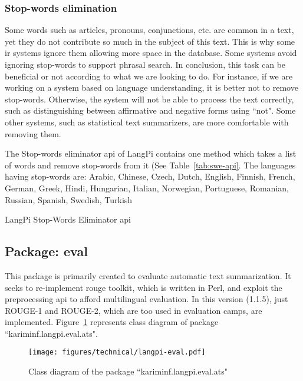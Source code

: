 \subsubsection{Stop-words elimination}

Some words such as articles, pronouns, conjunctions, etc. are common in a text, yet they do not contribute so much in the subject of this text. 
This is why some \ac{ir} systems ignore them allowing more space in the database. 
Some systems avoid ignoring stop-words to support phrasal search. 
In conclusion, this task can be beneficial or not according to what we are looking to do. 
For instance, if we are working on a system  based on language understanding, it is better not to remove stop-words. 
Otherwise, the system will not be able to process the text correctly, such as distinguishing between affirmative and negative forms using ``not". 
Some other systems, such as statistical text summarizers, are more comfortable with removing them. 


The Stop-words eliminator \ac{api} of LangPi contains one method which takes a list of words and remove stop-words from it (See Table~\ref{tab:swe-api}. 
The languages having stop-words are: Arabic, Chinese, Czech, Dutch, English, Finnish, French, German, Greek, Hindi, Hungarian, Italian, Norwegian, Portuguese, Romanian, Russian, Spanish, Swedish, Turkish
\begin{table}[!ht]
	\centering
	\caption{LangPi Stop-Words Eliminator \ac{api}}
	\label{tab:swe-api}
\end{table}


\subsection{Package: eval}

This package is primarily created to evaluate automatic text summarization. 
It seeks to re-implement \ac{rouge} toolkit, which is written in Perl, and exploit the preprocessing \ac{api} to afford multilingual evaluation. 
In this version (1.1.5), just ROUGE-1 and ROUGE-2, which are too used in evaluation camps, are implemented.
Figure~\ref{fig:langpi-eval} represents class diagram of package ``kariminf.langpi.eval.ats".
%
\begin{figure}[!ht]
	\begin{center}
		\texttt{[image: figures/technical/langpi-eval.pdf]}
	\end{center}
	\caption{\label{fig:langpi-eval} Class diagram of the package ``kariminf.langpi.eval.ats"}
\end{figure}

